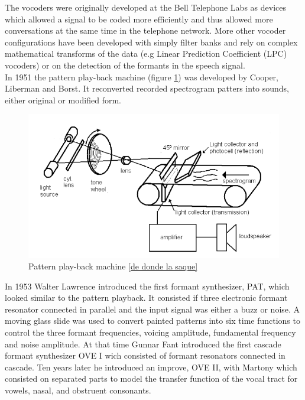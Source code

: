 The vocoders were originally developed at the Bell Telephone Labs as devices which allowed a signal to be coded more efficiently and thus allowed more conversations at the same time in the telephone network. More other vocoder configurations have been developed with simply filter banks and rely on complex mathematical transforms of the data (e.g Linear Prediction Coefficient (LPC) vocoders) or on the detection of the formants in the speech signal.\\
In 1951 the pattern play-back machine (figure \ref{spectro}) was developed by Cooper, Liberman and Borst. It reconverted recorded spectrogram patters into sounds, either original or modified form.\\
\begin{figure}[!htb]
	\begin{center}
	\includegraphics[width=1\textwidth]{img/spectrogram.png}
	\end{center}
	\caption{\label{spectro}Pattern play-back machine \ref{de donde la saque}}
\end{figure}
In 1953 Walter Lawrence introduced the first formant synthesizer, PAT, which looked similar to the pattern playback. It consisted if three electronic formant resonator connected in parallel and the input signal was either a buzz or noise. A moving glass slide was used to convert painted patterns into six time functions to control the three formant frequencies, voicing amplitude, fundamental frequency and noise amplitude. At that time Gunnar Fant introduced the first cascade formant synthesizer OVE I wich consisted of formant resonators connected in cascade. Ten years later he introduced an improve, OVE II, with Martony which consisted on separated parts to model the transfer function of the vocal tract for vowels, nasal, and obstruent consonants.\\
